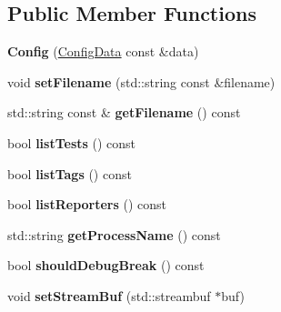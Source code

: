 \subsection*{Public Member Functions}
\begin{DoxyCompactItemize}
\item 
\hypertarget{class_catch_1_1_config_a25ad0360a8386e7bc068c9c1ac5320bf}{{\bfseries Config} (\hyperlink{struct_catch_1_1_config_data}{Config\-Data} const \&data)}\label{class_catch_1_1_config_a25ad0360a8386e7bc068c9c1ac5320bf}

\item 
\hypertarget{class_catch_1_1_config_a08d869cec45133f75153a3e0f6095c71}{void {\bfseries set\-Filename} (std\-::string const \&filename)}\label{class_catch_1_1_config_a08d869cec45133f75153a3e0f6095c71}

\item 
\hypertarget{class_catch_1_1_config_aa9e256dae92ddb8502ff3680f8a5d87f}{std\-::string const \& {\bfseries get\-Filename} () const }\label{class_catch_1_1_config_aa9e256dae92ddb8502ff3680f8a5d87f}

\item 
\hypertarget{class_catch_1_1_config_aea015d29bfbe2518c4645ff0ea6d210e}{bool {\bfseries list\-Tests} () const }\label{class_catch_1_1_config_aea015d29bfbe2518c4645ff0ea6d210e}

\item 
\hypertarget{class_catch_1_1_config_a9dff59d5f71ce2d43719926d017e496e}{bool {\bfseries list\-Tags} () const }\label{class_catch_1_1_config_a9dff59d5f71ce2d43719926d017e496e}

\item 
\hypertarget{class_catch_1_1_config_a3107e37f61a84ca8914a107ecd1cb343}{bool {\bfseries list\-Reporters} () const }\label{class_catch_1_1_config_a3107e37f61a84ca8914a107ecd1cb343}

\item 
\hypertarget{class_catch_1_1_config_a7b0b80011521c7247f2365e213d0057c}{std\-::string {\bfseries get\-Process\-Name} () const }\label{class_catch_1_1_config_a7b0b80011521c7247f2365e213d0057c}

\item 
\hypertarget{class_catch_1_1_config_a404b40d7f51f3ee0955e737a4729a162}{bool {\bfseries should\-Debug\-Break} () const }\label{class_catch_1_1_config_a404b40d7f51f3ee0955e737a4729a162}

\item 
\hypertarget{class_catch_1_1_config_adacc2540c7876de06869ba56b14504da}{void {\bfseries set\-Stream\-Buf} (std\-::streambuf $\ast$buf)}\label{class_catch_1_1_config_adacc2540c7876de06869ba56b14504da}


\end{DoxyCompactItemize}
